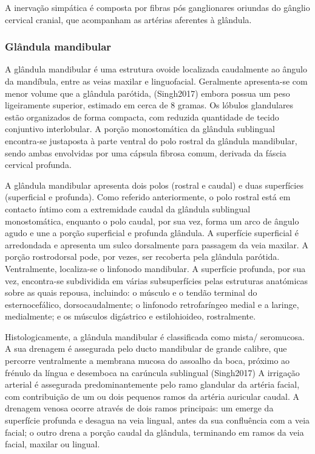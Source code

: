 A inervação simpática é composta por fibras pós ganglionares oriundas do gânglio cervical cranial, que acompanham as artérias aferentes à glândula.\cite{Singh2017}

\subsubsection{Glândula mandibular}

A glândula mandibular é uma estrutura ovoide \cite{evans_millers_2012}\cite{Singh2017}localizada caudalmente ao ângulo da mandíbula, entre as veias maxilar e linguofacial. Geralmente apresenta-se com menor volume que a glândula parótida, (Singh2017) embora possua um peso ligeiramente superior, estimado em cerca de 8 gramas. Os lóbulos glandulares estão organizados de forma compacta, com reduzida quantidade de tecido conjuntivo interlobular. A porção monostomática da glândula sublingual encontra-se justaposta à parte ventral do polo rostral da glândula mandibular, sendo ambas envolvidas por uma cápsula fibrosa comum, derivada da fáscia cervical profunda.


A glândula mandibular apresenta dois polos (rostral e caudal) e duas superfícies (superficial e profunda). Como referido anteriormente, o polo rostral está em contacto íntimo com a extremidade caudal da glândula sublingual monostomática, enquanto o polo caudal, por sua vez, forma um arco de ângulo agudo e une a porção superficial e profunda glândula. A superfície superficial é arredondada e apresenta um sulco dorsalmente para passagem da veia maxilar. A porção rostrodorsal pode, por vezes, ser recoberta pela glândula parótida. Ventralmente, localiza-se o linfonodo mandibular. A superfície profunda, por sua vez, encontra-se subdividida em várias subsuperfícies pelas estruturas anatómicas sobre as quais repousa, incluindo: o músculo e o tendão terminal do esternocefálico, dorsocaudalmente; o linfonodo retrofaríngeo medial e a laringe, medialmente; e os músculos digástrico e estilohioideo, rostralmente.


Histologicamente, a glândula mandibular é classificada como mista/ seromucosa. \cite{evans_millers_2012} \cite{Singh2017}
A sua drenagem é assegurada pelo ducto mandibular de grande calibre, que percorre ventralmente a membrana mucosa do assoalho  da boca, próximo ao frénulo da língua e desemboca na carúncula sublingual (Singh2017)
A irrigação arterial é assegurada predominantemente pelo ramo glandular da artéria facial, com contribuição de um ou dois pequenos ramos da artéria auricular caudal. A drenagem venosa ocorre através de dois ramos principais: um emerge da superfície profunda e desagua na veia lingual, antes da sua confluência com a veia facial; o outro drena a porção caudal da glândula, terminando em ramos da veia facial, maxilar ou lingual.


